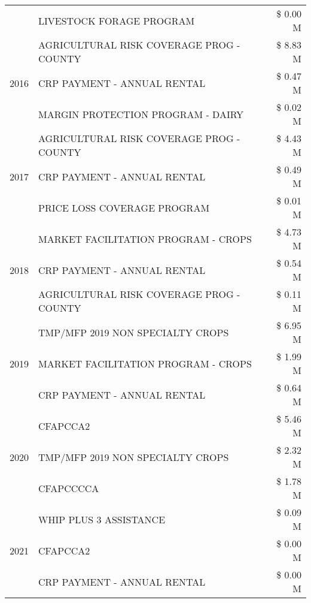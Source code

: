 \begin{tabular}{llr}
 & LIVESTOCK FORAGE PROGRAM & \$ 0.00 M \\
\cline{1-3}
\multirow[t]{3}{*}{2016} & AGRICULTURAL RISK COVERAGE PROG - COUNTY      & \$ 8.83 M \\
 & CRP PAYMENT - ANNUAL RENTAL                   & \$ 0.47 M \\
 & MARGIN PROTECTION PROGRAM - DAIRY             & \$ 0.02 M \\
\cline{1-3}
\multirow[t]{3}{*}{2017} & AGRICULTURAL RISK COVERAGE PROG - COUNTY & \$ 4.43 M \\
 & CRP PAYMENT - ANNUAL RENTAL & \$ 0.49 M \\
 & PRICE LOSS COVERAGE PROGRAM & \$ 0.01 M \\
\cline{1-3}
\multirow[t]{3}{*}{2018} & MARKET FACILITATION PROGRAM - CROPS & \$ 4.73 M \\
 & CRP PAYMENT - ANNUAL RENTAL & \$ 0.54 M \\
 & AGRICULTURAL RISK COVERAGE PROG - COUNTY & \$ 0.11 M \\
\cline{1-3}
\multirow[t]{3}{*}{2019} & TMP/MFP 2019 NON SPECIALTY CROPS & \$ 6.95 M \\
 & MARKET FACILITATION PROGRAM - CROPS & \$ 1.99 M \\
 & CRP PAYMENT - ANNUAL RENTAL & \$ 0.64 M \\
\cline{1-3}
\multirow[t]{3}{*}{2020} & CFAPCCA2 & \$ 5.46 M \\
 & TMP/MFP 2019 NON SPECIALTY CROPS & \$ 2.32 M \\
 & CFAPCCCCA & \$ 1.78 M \\
\cline{1-3}
\multirow[t]{3}{*}{2021} & WHIP PLUS 3 ASSISTANCE & \$ 0.09 M \\
 & CFAPCCA2 & \$ 0.00 M \\
 & CRP PAYMENT - ANNUAL RENTAL & \$ 0.00 M \\
\cline{1-3}
\bottomrule
\end{tabular}
